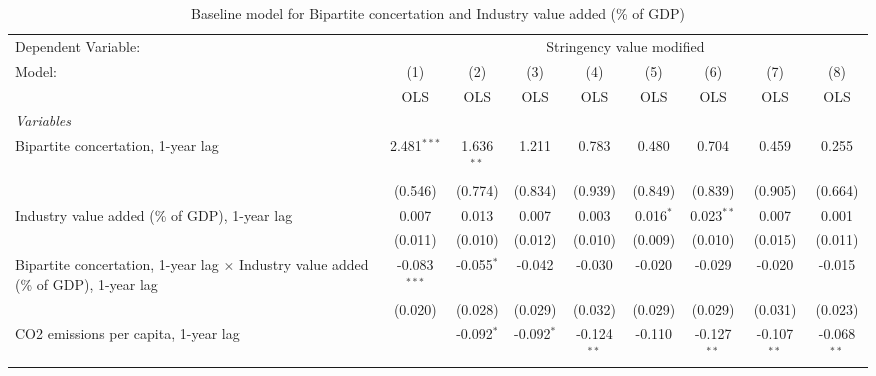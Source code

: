 
\begin{table}[htbp]
   \caption{Baseline model for Bipartite concertation and Industry value added (\% of GDP)}
   \centering
   \begin{tabular}{lcccccccc}
      \toprule
      Dependent Variable: & \multicolumn{8}{c}{Stringency value modified}\\
      Model:                                                                                     & (1)            & (2)          & (3)           & (4)           & (5)           & (6)           & (7)           & (8)\\  
                                                                                                 &  OLS           & OLS          & OLS           & OLS           & OLS           & OLS           & OLS           & OLS\\  
      \midrule
      \emph{Variables}\\
      Bipartite concertation, 1-year lag                                                         & 2.481$^{***}$  & 1.636$^{**}$ & 1.211         & 0.783         & 0.480         & 0.704         & 0.459         & 0.255\\   
                                                                                                 & (0.546)        & (0.774)      & (0.834)       & (0.939)       & (0.849)       & (0.839)       & (0.905)       & (0.664)\\   
      Industry value added (\% of GDP), 1-year lag                                               & 0.007          & 0.013        & 0.007         & 0.003         & 0.016$^{*}$   & 0.023$^{**}$  & 0.007         & 0.001\\   
                                                                                                 & (0.011)        & (0.010)      & (0.012)       & (0.010)       & (0.009)       & (0.010)       & (0.015)       & (0.011)\\   
      Bipartite concertation, 1-year lag $\times$ Industry value added (\% of GDP), 1-year lag   & -0.083$^{***}$ & -0.055$^{*}$ & -0.042        & -0.030        & -0.020        & -0.029        & -0.020        & -0.015\\   
                                                                                                 & (0.020)        & (0.028)      & (0.029)       & (0.032)       & (0.029)       & (0.029)       & (0.031)       & (0.023)\\   
      CO2 emissions per capita, 1-year lag                                                       &                & -0.092$^{*}$ & -0.092$^{*}$  & -0.124$^{**}$ & -0.110        & -0.127$^{**}$ & -0.107$^{**}$ & -0.068$^{**}$\\   

\end{tabular}
\end{table}
